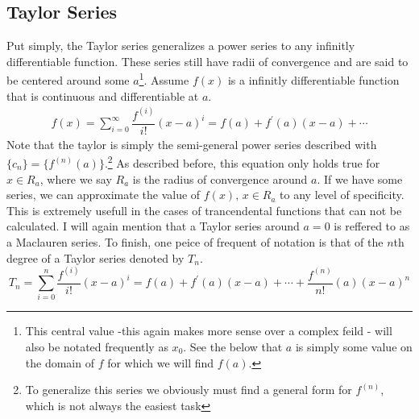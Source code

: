 \documentclass[11pt]{article}
\begin{document}
	\subsection*{Taylor Series}
		Put simply, the Taylor series generalizes a power series to any infinitly differentiable function. These series still have radii of convergence
		and are said to be centered around some $a$\footnote{This central value -this again makes more sense over a complex feild - will also be notated 
		frequently as $x_0$. See the below that $a$ is simply some value on the domain of $f$ for which we will find $f(a)$.}. Assume $f(x)$ is a 
		infinitly differentiable function that is continuous and differentiable at $a$.
			\begin{align}
				f(x) = \sum_{i = 0}^{\infty} \dfrac{f^{(i)}}{i!} (x - a)^i 
					 = f(a) + f^{'}(a)(x - a) + \cdots
			\end{align}
		Note that the taylor is simply the semi-general power series described with $\{c_n\} = \{f^{(n)}(a)\}$.\footnote{To generalize this series we 
		obviously must find a general form for $f^{(n)}$, which is not always the easiest task} As described before, this equation
		only holds true for $x\in R_a$, where we say $R_a$ is the radius of convergence around $a$. If we have some series, we can approximate
		the value of $f(x),\, x\in R_a$ to any level of specificity. This is extremely usefull in the cases of trancendental functions that can
		not be calculated. I will again mention that a Taylor series around $a = 0$ is reffered to as a Maclauren series. To finish, one peice
		of frequent of notation is that of the $n$th degree of a Taylor series denoted by $T_n$.
			\begin{equation}
				T_n = \sum_{i = 0}^{n} \dfrac{f^{(i)}}{i!} (x - a)^i 
					 = f(a) + f^{'}(a)(x - a) + \cdots + \dfrac{f^{(n)}}{n!}(a)(x - a)^n
			\end{equation}
\end{document}

